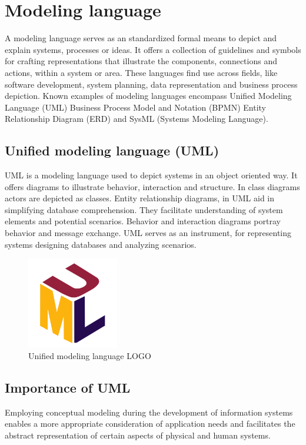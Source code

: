 \section{Modeling language}
A modeling language serves as an standardized formal means to depict and explain systems, processes or ideas. It offers a collection of guidelines and symbols for crafting representations that illustrate the components, connections and actions, within a system or area. These languages find use across fields, like software development, system planning, data representation and business process depiction. Known examples of modeling languages encompass Unified Modeling Language (UML) Business Process Model and Notation (BPMN) Entity Relationship Diagram (ERD) and SysML (Systems Modeling Language).

\subsection{Unified modeling language (UML)}
UML is a modeling language used to depict systems in an object oriented way. It offers diagrams to illustrate behavior, interaction and structure. In class diagrams actors are depicted as classes. Entity relationship diagrams, in UML aid in simplifying database comprehension. They facilitate understanding of system elements and potential scenarios. Behavior and interaction diagrams portray behavior and message exchange. UML serves as an instrument, for representing systems designing databases and analyzing scenarios.

\begin{figure}[H]
    \centering
    \includegraphics[height=4cm]{images/chap1/UML.png}
    \caption{Unified modeling language LOGO}
    \label{fig:enter-label}
\end{figure}

\subsection{Importance of UML}

Employing conceptual modeling during the development of information systems enables a more appropriate consideration of application needs and facilitates the abstract representation of certain aspects of physical and human systems.


